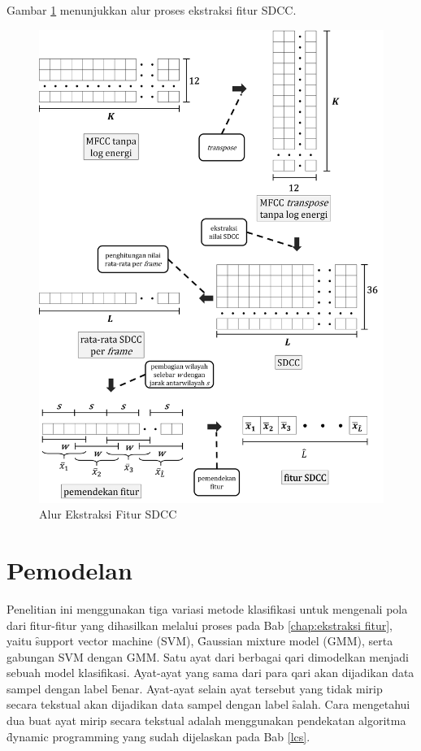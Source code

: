 \begin{enumerate}
  Gambar \ref{fig:alurekstraksifitursdcc} menunjukkan alur proses ekstraksi fitur SDCC.
  \begin{figure}
    \centering
    \includegraphics[width=\linewidth]{pics/ekstraksi_sdcc_v2}
    \caption{Alur Ekstraksi Fitur SDCC}
    \label{fig:alurekstraksifitursdcc}
  \end{figure}
\end{enumerate}



\section{Pemodelan} \label{chap:pemodelan}
Penelitian ini menggunakan tiga variasi metode klasifikasi untuk mengenali pola dari fitur-fitur yang dihasilkan melalui proses pada Bab \ref{chap:ekstraksi fitur}, yaitu \f{support vector machine} (SVM), \f{Gaussian mixture model} (GMM), serta gabungan SVM dengan GMM. Satu ayat dari berbagai qari dimodelkan menjadi sebuah model klasifikasi. Ayat-ayat yang sama dari para qari akan dijadikan data sampel dengan label \f{benar}. Ayat-ayat selain ayat tersebut yang tidak mirip secara tekstual akan dijadikan data sampel dengan label \f{salah}. Cara mengetahui dua buat ayat mirip secara tekstual adalah menggunakan pendekatan algoritma \f{dynamic programming} yang sudah dijelaskan pada Bab \ref{lcs}.

